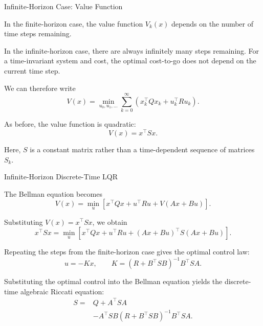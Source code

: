 \documentclass{beamer}
\begin{document}
\begin{frame}{Infinite-Horizon Case: Value Function}
	\begin{flushleft}
		
		In the finite-horizon case, the value function $V_k(x)$
		depends on the number of time steps remaining.
		
		\medskip
		
		In the infinite-horizon case, there are always infinitely
		many steps remaining. For a time-invariant system and
		cost, the optimal cost-to-go does not depend on the
		current time step.
		
		\medskip
		
		We can therefore write
		\[
		V(x)=\min_{u_0,u_1,\ldots}
		\sum_{k=0}^{\infty}
		\left(x_k^\top Qx_k+u_k^\top Ru_k\right).
		\]
		
		\medskip
		
		As before, the value function is quadratic:
		\[
		\boxed{V(x)=x^\top Sx.}
		\]
		
		Here, $S$ is a constant matrix rather than a
		time-dependent sequence of matrices $S_k$.
		
	\end{flushleft}
\end{frame}

\begin{frame}{Infinite-Horizon Discrete-Time LQR}
	\begin{flushleft}
		
		The Bellman equation becomes
		\[
		V(x)=\min_u
		\left[
		x^\top Qx+u^\top Ru+V(Ax+Bu)
		\right].
		\]
		
		Substituting $V(x)=x^\top Sx$, we obtain
		\[
		x^\top Sx=\min_u
		\left[
		x^\top Qx+u^\top Ru
		+(Ax+Bu)^\top S(Ax+Bu)
		\right].
		\]
		
		\medskip
		
		Repeating the steps from the finite-horizon case gives
		the optimal control law:
		\[
		\boxed{
			u=-Kx,
			\qquad
			K=(R+B^\top SB)^{-1}B^\top SA.
		}
		\]
		
		\medskip
		
		Substituting the optimal control into the Bellman
		equation yields the discrete-time algebraic
		Riccati equation:
		\[
		\boxed{
			\begin{aligned}
				S={}&Q+A^\top SA\\
				&-A^\top SB(R+B^\top SB)^{-1}B^\top SA.
			\end{aligned}
		}
		\]
		
	\end{flushleft}
\end{frame}
\end{document}
